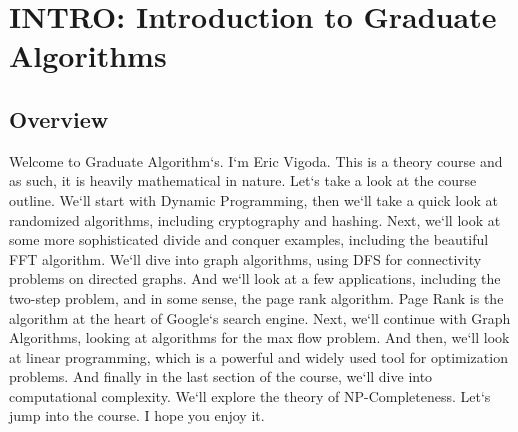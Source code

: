 \section{INTRO: Introduction to Graduate Algorithms}

\subsection{Overview}
Welcome to Graduate Algorithm`s.
I`m Eric Vigoda.
This is a theory course and as such, it is heavily mathematical in nature.
Let`s take a look at the course outline.
We`ll start with Dynamic Programming, then we`ll take a quick look at randomized algorithms, including cryptography and hashing.
Next, we`ll look at some more sophisticated divide and conquer examples, including the beautiful FFT algorithm.
We`ll dive into graph algorithms, using DFS for connectivity problems on directed graphs.
And we`ll look at a few applications, including the two-step problem, and in some sense, the page rank algorithm.
Page Rank is the algorithm at the heart of Google`s search engine.
Next, we`ll continue with Graph Algorithms, looking at algorithms for the max flow problem.
And then, we`ll look at linear programming, which is a powerful and widely used tool for optimization problems.
And finally in the last section of the course, we`ll dive into computational complexity.
We`ll explore the theory of NP-Completeness.
Let`s jump into the course.
I hope you enjoy it.

